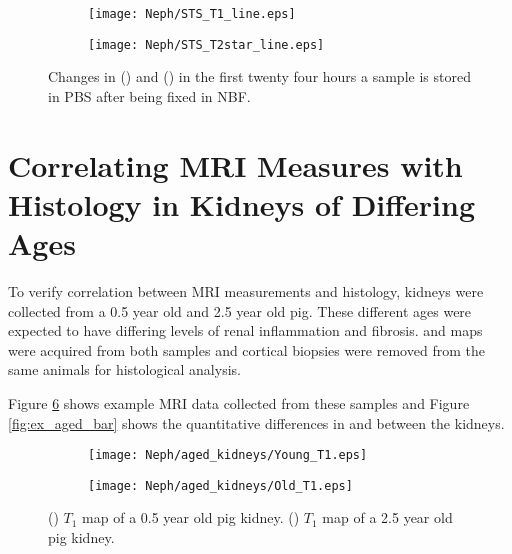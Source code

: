 \begin{figure}[H]
	\centering
	\begin{subfigure}[c]{0.47\textwidth}
		\centering
		\texttt{[image: Neph/STS\_T1\_line.eps]}
		\caption{}
		\label{fig:ex_fixation_t1_3t_sts}
	\end{subfigure}
	\hfill
	\begin{subfigure}[c]{0.47\textwidth}
		\centering
		\texttt{[image: Neph/STS\_T2star\_line.eps]}
		\caption{}
		\label{fig:ex_fixation_t2star_3t_sts}
	\end{subfigure}
	\caption{Changes in \tone () and \ttwostar () in the first twenty four hours a sample is stored in \ac{PBS} after being fixed in \ac{NBF}.}
	\label{fig:ex_fixation_sts}
\end{figure}
\section{Correlating MRI Measures with Histology in Kidneys of Differing Ages}
\label{sec:ex_ages}
To verify correlation between \ac{MRI} measurements and histology, kidneys were collected from a 0.5 year old and 2.5 year old pig. These different ages were expected to have differing levels of renal inflammation and fibrosis. \tone and \ttwostar maps were acquired from both samples and cortical biopsies were removed from the same animals for histological analysis. 

Figure \ref{fig:ex_aged_map} shows example \ac{MRI} data collected from these samples and Figure \ref{fig:ex_aged_bar} shows the quantitative differences in \tone and \ttwo between the kidneys. 

\begin{figure}[H]
	\centering
	\begin{subfigure}[c]{0.47\textwidth}
		\centering
		\texttt{[image: Neph/aged\_kidneys/Young\_T1.eps]}
		\caption{}
		\label{fig:ex_aged_t1_map}
	\end{subfigure}
	\hfill
	\begin{subfigure}[c]{0.47\textwidth}
		\centering
		\texttt{[image: Neph/aged\_kidneys/Old\_T1.eps]}
		\caption{}
		\label{fig:ex_aged_t2star_map}
	\end{subfigure}
	\caption{() $T_1$ map of a 0.5 year old pig kidney. () $T_1$ map of a 2.5 year old pig kidney.}
	\label{fig:ex_aged_map}
\end{figure}

